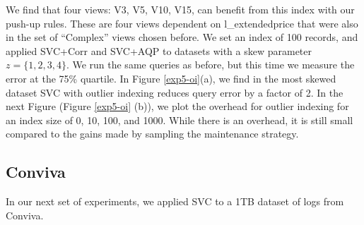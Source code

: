 We find that four views: V3, V5, V10, V15, can benefit from this index with our push-up rules. 
These are four views dependent on \textsf{l\_extendedprice} that were also in the set of ``Complex'' views chosen before.
We set an index of 100 records, and applied SVC+Corr and SVC+AQP to datasets with a skew parameter $z=\{1,2,3,4\}$. 
We run the same queries as before, but this time we measure the error at the 75\% quartile.
In Figure \ref{exp5-oi}(a), we find in the most skewed dataset SVC with outlier indexing reduces query error by a factor of 2.
In the next Figure \big(Figure \ref{exp5-oi} (b)\big), we plot the overhead for outlier indexing for an index size of 0, 10, 100, and 1000.
While there is an overhead, it is still small compared to the gains made by sampling the maintenance strategy.

\subsection{Conviva}
In our next set of experiments, we applied SVC to a 1TB dataset of logs from Conviva.

